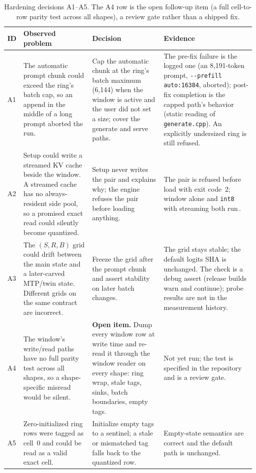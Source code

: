 \documentclass[10pt,twocolumn]{article}
\begin{document}
\begin{table}[t]
\centering
\small
\begin{tabularx}{\textwidth}{@{}l >{\raggedright\arraybackslash}X >{\raggedright\arraybackslash}X >{\raggedright\arraybackslash}X@{}}
\toprule
\textbf{ID} & \textbf{Observed problem} & \textbf{Decision} & \textbf{Evidence} \\
\midrule
A1 & The automatic prompt chunk could exceed the ring's batch cap, so an append in the middle of a long prompt aborted the run. & Cap the automatic chunk at the ring's batch maximum (6,144) when the window is active and the user did not set a size; cover the generate and serve paths. & The pre-fix failure is the logged one (an 8,191-token prompt, \texttt{-{}-prefill auto:16384}, aborted); post-fix completion is the capped path's behavior (static reading of \texttt{generate.cpp}). An explicitly undersized ring is still refused. \\
A2 & Setup could write a streamed KV cache beside the window. A streamed cache has no always-resident side pool, so a promised exact read could silently become quantized. & Setup never writes the pair and explains why; the engine refuses the pair before loading anything. & The pair is refused before load with exit code~2; window alone and \texttt{int8} with streaming both run\,\cite{strata-details}. \\
A3 & The $(S,R,B)$ grid could drift between the main state and a later-carved MTP/twin state. Different grids on the same contract are incorrect. & Freeze the grid after the prompt chunk and assert stability on later batch changes. & The grid stays stable; the default logits SHA is unchanged. The check is a debug assert (release builds warn and continue); probe results are not in the measurement history. \\
A4 & The window's write/read paths have no full parity test across all shapes, so a shape-specific misread would be silent. & \textbf{Open item.} Dump every window row at write time and re-read it through the window reader on every shape: ring wrap, stale tags, sinks, batch boundaries, empty tags. & Not yet run; the test is specified in the repository and is a review gate. \\
A5 & Zero-initialized ring rows were tagged as cell~0 and could be read as a valid exact cell. & Initialize empty tags to a sentinel; a stale or mismatched tag falls back to the quantized row. & Empty-state semantics are correct and the default path is unchanged. \\
\bottomrule
\end{tabularx}
\caption{Hardening decisions A1--A5. The A4 row is the open follow-up item (a full cell-to-row parity test across all shapes), a review gate rather than a shipped fix.}
\label{tab:decisions}
\end{table}
\end{document}

